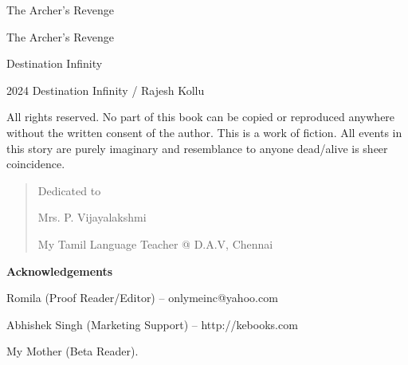 \frontmatter
\pagestyle{empty}

\begin{center}
\HUGE\textsf{The Archer's Revenge}
\end{center}
\cleardoublepage

\begin{center}
\HUGE\textsf{The Archer's Revenge}\par
\end{center}

\begin{center}
\LARGE\textsf{Destination Infinity}\par
\end{center}
\clearpage

\begingroup
\footnotesize
\setlength{\parindent}{0pt}
\setlength{\parskip}{\baselineskip}

\textcopyright{} 2024 Destination Infinity / Rajesh Kollu

All rights reserved. No part of this book can be copied or reproduced anywhere without the written
consent of the author. This is a work of fiction. All events in this story are
purely imaginary and resemblance to anyone dead/alive is sheer coincidence.

\endgroup
\clearpage

\begin{quote}
\begin{center}Dedicated to

\LARGE
Mrs. P. Vijayalakshmi
\normalsize

My Tamil Language Teacher @ D.A.V, Chennai
\end{center}
\end{quote}

\vfill

\textbf{Acknowledgements}

Romila (Proof Reader/Editor) – onlymeinc@yahoo.com


Abhishek Singh (Marketing Support) – http://kebooks.com

My Mother (Beta Reader).


\clearpage